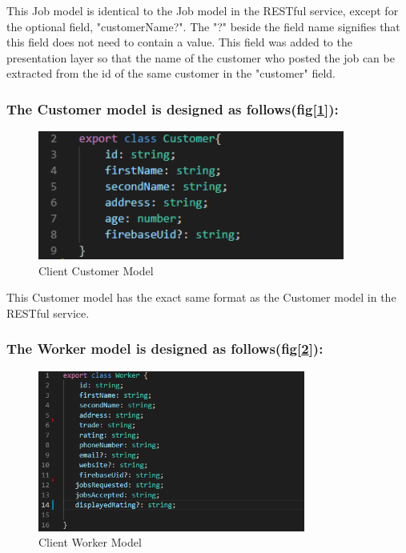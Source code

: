 \bigskip

This Job model is identical to the Job model in the RESTful service, except for the optional field, "customerName?". The "?" beside the field name signifies that this field does not need to contain a value. This field was added to the presentation layer so that the name of the customer who posted the job can be extracted from the id of the same customer in the "customer" field. 

\subsubsection{The Customer model is designed as follows(fig[\ref{fig:clientCustomer}]):}

\begin{figure}[H]
    \centering
    \includegraphics[width=\textwidth, height=120pt]{DesignImages/AngularCustomer.PNG}
    \caption{Client Customer Model}
    \label{fig:clientCustomer}
\end{figure}

\bigskip

This Customer model has the exact same format as the Customer model in the RESTful service. 

\subsubsection{The Worker model is designed as follows(fig[\ref{fig:workerClient}]):}

\begin{figure}[H]
    \centering
    \includegraphics[width=\textwidth, height=150pt]{DesignImages/AngularWorker.PNG}
    \caption{Client Worker Model}
    \label{fig:workerClient}
\end{figure}

